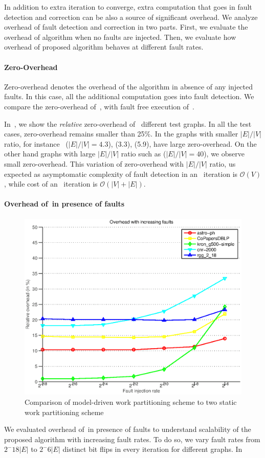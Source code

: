 In addition to extra iteration to converge, extra computation that goes in 
fault detection  and correction can be also a source of significant overhead. 
We analyze overhead of fault detection and correction in two parts.
 First, we evaluate the overhead of algorithm \ftsv when no faults are injected.
  Then, we evaluate how overhead of proposed algorithm behaves at different fault rates. 

\paragraph{Zero-Overhead} Zero-overhead denotes the overhead of the algorithm 
in absence of any injected faults. In this case, all the additional computation
 goes into fault detection. We compare the zero-overhead of~, with 
 fault free execution of~. 

 In~, we show the \emph{relative} zero-overhead of~ 
 different test graphs. In all the test cases, zero-overhead remains smaller than 25\%. 
 In the graphs with smaller $|E|/|V|$ ratio, for instance~ ($|E|/|V|=4.3$),
  (3.3),  (5.9), have large zero-overhead. On the other hand graphs with large $|E|/|V|$ ratio such as  ($|E|/|V|=40$), we observe small zero-overhead. This variation of zero-overhead with $|E|/|V|$ ratio, us expected as asymptomatic complexity of fault detection in an ~\ftsv iteration is $\mathcal{O}(V)$, while cost of an ~\sv iteration is $\mathcal{O}(|V|+|E|)$.  

\paragraph{Overhead of~\ftsv in presence of faults}

\begin{figure}[ht]
\includegraphics[width=.5\textwidth]{plots/plot_overhead_fault.eps}
\caption{\label{fig:oh-plot} 
\small Comparison of model-driven work partitioning scheme to
two static work partitioning scheme}
\end{figure}

We evaluated overhead of~\ftsv in presence of faults to understand scalability of the proposed algorithm 
with increasing fault rates. To do so, we vary fault rates from $2^-{18}|E|$ to $2^-{6}|E|$ distinct bit flips in every iteration for different graphs. In ~






